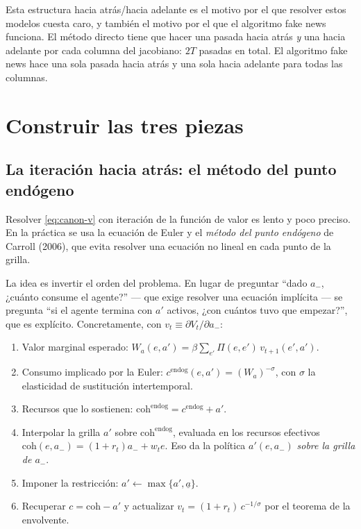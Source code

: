 \begin{idea}
Esta estructura hacia atrás/hacia adelante es el motivo por el que resolver estos
modelos cuesta caro, y también el motivo por el que el algoritmo fake news
funciona. El método directo tiene que hacer una pasada hacia atrás \emph{y} una
hacia adelante por cada columna del jacobiano: $2T$ pasadas en total. El
algoritmo fake news hace una sola pasada hacia atrás y una sola hacia adelante
para todas las columnas.
\end{idea}

\section{Construir las tres piezas}

\subsection{La iteración hacia atrás: el método del punto endógeno}

Resolver \eqref{eq:canon-v} con iteración de la función de valor es lento y poco
preciso. En la práctica se usa la ecuación de Euler y el \emph{método del punto
endógeno} de Carroll (2006), que evita resolver una ecuación no lineal en cada
punto de la grilla.

La idea es invertir el orden del problema. En lugar de preguntar ``dado
$a_-$, ¿cuánto consume el agente?'' --- que exige resolver una ecuación
implícita --- se pregunta ``si el agente termina con $a'$ activos, ¿con cuántos
tuvo que empezar?'', que es explícito. Concretamente, con $v_t \equiv \partial
V_t/\partial a_-$:

\begin{receta}
\begin{enumerate}[leftmargin=1.4em,itemsep=1pt]
\item Valor marginal esperado: $W_a(e,a') = \beta \sum_{e'} \Pi(e,e')\,v_{t+1}(e',a')$.
\item Consumo implicado por la Euler: $c^{\text{endog}}(e,a') = (W_a)^{-\sigma}$,
con $\sigma$ la elasticidad de sustitución intertemporal.
\item Recursos que lo sostienen: $\mathrm{coh}^{\text{endog}} = c^{\text{endog}} + a'$.
\item Interpolar la grilla $a'$ sobre $\mathrm{coh}^{\text{endog}}$, evaluada en
los recursos efectivos $\mathrm{coh}(e,a_-) = (1+r_t)a_- + w_t e$. Eso da la
política $a'(e,a_-)$ \emph{sobre la grilla de $a_-$}.
\item Imponer la restricción: $a' \leftarrow \max\{a', \underline{a}\}$.
\item Recuperar $c = \mathrm{coh} - a'$ y actualizar
$v_t = (1+r_t)\,c^{-1/\sigma}$ por el teorema de la envolvente.
\end{enumerate}
\end{receta}

